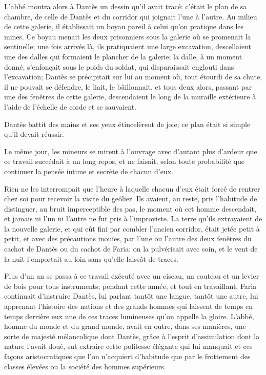 L'abbé montra alors à Dantès un dessin qu'il avait tracé: c'était le plan de sa chambre, de celle de Dantès et du corridor qui joignait l'une à l'autre. Au milieu de cette galerie, il établissait un boyau pareil à celui qu'on pratique dans les mines. Ce boyau menait les deux prisonniers sous la galerie où se promenait la sentinelle; une fois arrivés là, ils pratiquaient une large excavation, descellaient une des dalles qui formaient le plancher de la galerie; la dalle, à un moment donné, s'enfonçait sous le poids du soldat, qui disparaissait englouti dans l'excavation; Dantès se précipitait sur lui au moment où, tout étourdi de sa chute, il ne pouvait se défendre, le liait, le bâillonnait, et tous deux alors, passant par une des fenêtres de cette galerie, descendaient le long de la muraille extérieure à l'aide de l'échelle de corde et se sauvaient.

Dantès battit des mains et ses yeux étincelèrent de joie; ce plan était si simple qu'il devait réussir.

Le même jour, les mineurs se mirent à l'ouvrage avec d'autant plus d'ardeur que ce travail succédait à un long repos, et ne faisait, selon toute probabilité que continuer la pensée intime et secrète de chacun d'eux.

Rien ne les interrompait que l'heure à laquelle chacun d'eux était forcé de rentrer chez soi pour recevoir la visite du geôlier. Ils avaient, au reste, pris l'habitude de distinguer, au bruit imperceptible des pas, le moment où cet homme descendait, et jamais ni l'un ni l'autre ne fut pris à l'improviste. La terre qu'ils extrayaient de la nouvelle galerie, et qui eût fini par combler l'ancien corridor, était jetée petit à petit, et avec des précautions inouïes, par l'une ou l'autre des deux fenêtres du cachot de Dantès ou du cachot de Faria: on la pulvérisait avec soin, et le vent de la nuit l'emportait au loin sans qu'elle laissât de traces.

Plus d'un an se passa à ce travail exécuté avec un ciseau, un couteau et un levier de bois pour tous instruments; pendant cette année, et tout en travaillant, Faria continuait d'instruire Dantès, lui parlant tantôt une langue, tantôt une autre, lui apprenant l'histoire des nations et des grands hommes qui laissent de temps en temps derrière eux une de ces traces lumineuses qu'on appelle la gloire. L'abbé, homme du monde et du grand monde, avait en outre, dans ses manières, une sorte de majesté mélancolique dont Dantès, grâce à l'esprit d'assimilation dont la nature l'avait doué, sut extraire cette politesse élégante qui lui manquait et ces façons aristocratiques que l'on n'acquiert d'habitude que par le frottement des classes élevées ou la société des hommes supérieurs.

